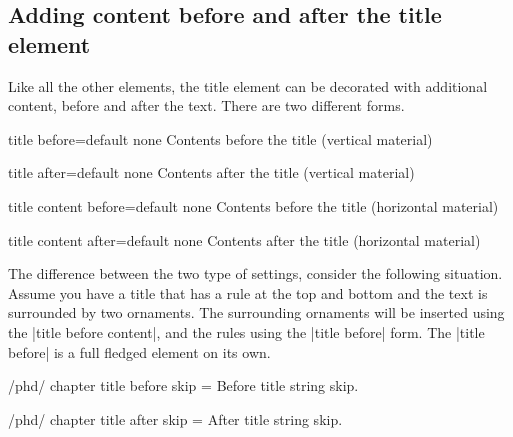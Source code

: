 \subsection{Adding content before and after the title element}

Like all the other elements, the title element can be decorated with additional content,
before and after the text. There are two different forms. 

\begin{docKey}[phd]{title before}{=}{default none}
Contents before the title (vertical material)
\end{docKey}

\begin{docKey}[phd]{title after}{=}{default none}
Contents after the title (vertical material)
\end{docKey}

\begin{docKey}[phd]{title content before}{=}{default none}
Contents before the title (horizontal material)
\end{docKey}

\begin{docKey}[phd]{title content after}{=}{default none}
Contents after the title (horizontal material)
\end{docKey}

The difference between the two type of settings, consider the following situation. Assume you have a title that has a rule at the top and bottom and the text is surrounded by two ornaments. The surrounding ornaments will be inserted using the |title before content|, and the rules using the |title before| form. The |title before| is a full fledged element on its own. 

%
%



 
\begin{key}{/phd/ chapter title before skip = }
Before title string skip.
\end{key}
  \begin{key}{/phd/ chapter title after skip = }
After title string skip.
\end{key}

\lorem 
%
%
%         
%
%



